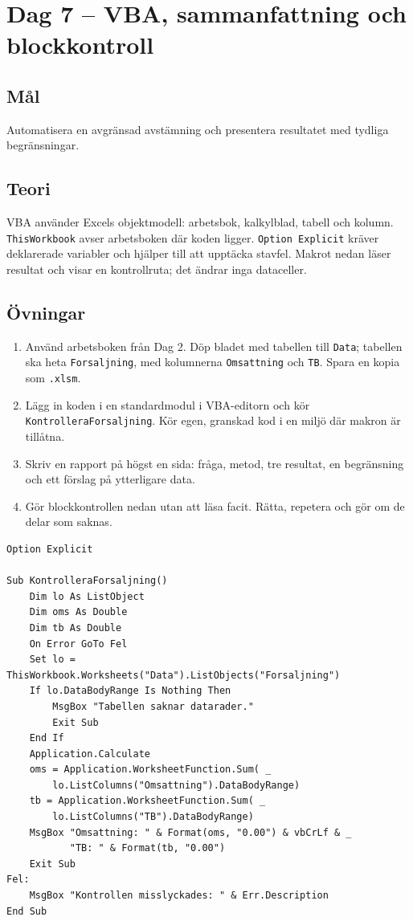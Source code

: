 \documentclass[11pt,a4paper]{article}
\newcommand{\dag}[2]{\clearpage\section{Dag #1 -- #2}}
\begin{document}
\dag{7}{VBA, sammanfattning och blockkontroll}
\subsection*{Mål}
Automatisera en avgränsad avstämning och presentera resultatet med tydliga begränsningar.
\subsection*{Teori}
VBA använder Excels objektmodell: arbetsbok, kalkylblad, tabell och kolumn. \texttt{ThisWorkbook} avser arbetsboken där koden ligger. \texttt{Option Explicit} kräver deklarerade variabler och hjälper till att upptäcka stavfel. Makrot nedan läser resultat och visar en kontrollruta; det ändrar inga dataceller.
\subsection*{Övningar}
\begin{enumerate}
\item Använd arbetsboken från Dag 2. Döp bladet med tabellen till \texttt{Data}; tabellen ska heta \texttt{Forsaljning}, med kolumnerna \texttt{Omsattning} och \texttt{TB}. Spara en kopia som \texttt{.xlsm}.
\item Lägg in koden i en standardmodul i VBA-editorn och kör \texttt{KontrolleraForsaljning}. Kör egen, granskad kod i en miljö där makron är tillåtna.
\item Skriv en rapport på högst en sida: fråga, metod, tre resultat, en begränsning och ett förslag på ytterligare data.
\item Gör blockkontrollen nedan utan att läsa facit. Rätta, repetera och gör om de delar som saknas.
\end{enumerate}
\begin{lstlisting}
Option Explicit

Sub KontrolleraForsaljning()
    Dim lo As ListObject
    Dim oms As Double
    Dim tb As Double
    On Error GoTo Fel
    Set lo = ThisWorkbook.Worksheets("Data").ListObjects("Forsaljning")
    If lo.DataBodyRange Is Nothing Then
        MsgBox "Tabellen saknar datarader."
        Exit Sub
    End If
    Application.Calculate
    oms = Application.WorksheetFunction.Sum( _
        lo.ListColumns("Omsattning").DataBodyRange)
    tb = Application.WorksheetFunction.Sum( _
        lo.ListColumns("TB").DataBodyRange)
    MsgBox "Omsattning: " & Format(oms, "0.00") & vbCrLf & _
           "TB: " & Format(tb, "0.00")
    Exit Sub
Fel:
    MsgBox "Kontrollen misslyckades: " & Err.Description
End Sub
\end{lstlisting}
\end{document}
